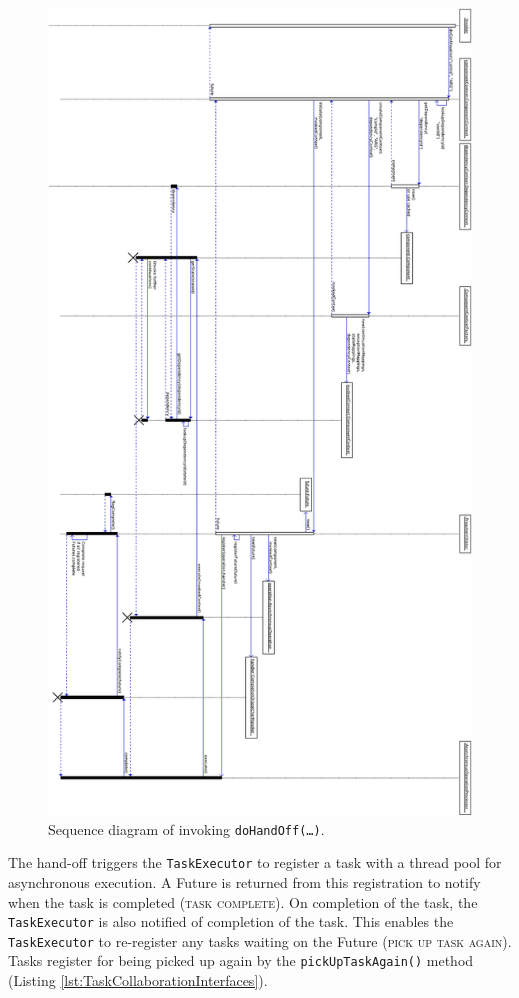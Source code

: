 \documentclass[prodmode]{style/acmlarge}
\begin{document}
\begin{figure}[!t]
\centering
\includegraphics[width=6in]{DoContinuationSequenceDiagram}
\caption{Sequence diagram of invoking \texttt{doHandOff(\ldots)}.}
\label{fig:DoContinuationSequenceDiagram}
\end{figure}

The hand-off triggers the \texttt{TaskExecutor} to register a task with a thread
pool for asynchronous execution.  A Future is returned from this registration to
notify when the task is completed (\textsc{task complete}).  On completion of
the task, the \texttt{TaskExecutor} is also notified of completion of the task.
This enables the \texttt{TaskExecutor} to re-register any tasks waiting on the
Future (\textsc{pick up task again}).  Tasks register for being picked up again
by the \texttt{pickUpTaskAgain()} method (Listing
\ref{lst:TaskCollaborationInterfaces}).
\end{document}
